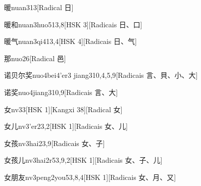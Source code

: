\begin{entry}{暖}{nuan3}{13}[Radical ⽇]
\end{entry}

\begin{entry}{暖和}{nuan3huo5}{13,8}[HSK 3][Radicais ⽇、⼝]
\end{entry}

\begin{entry}{暖气}{nuan3qi4}{13,4}[HSK 4][Radicais ⽇、⽓]
\end{entry}

\begin{entry}{那}{nuo2}{6}[Radical ⾢]
\end{entry}

\begin{entry}{诺贝尔奖}{nuo4bei4'er3 jiang3}{10,4,5,9}[Radicais ⾔、⾙、⼩、⼤]
\end{entry}

\begin{entry}{诺奖}{nuo4jiang3}{10,9}[Radicais ⾔、⼤]
\end{entry}

\begin{entry}{女}{nv3}{3}[HSK 1][Kangxi 38][Radical ⼥]
\end{entry}

\begin{entry}{女儿}{nv3'er2}{3,2}[HSK 1][Radicais ⼥、⼉]
\end{entry}

\begin{entry}{女孩}{nv3hai2}{3,9}[Radicais ⼥、⼦]
\end{entry}

\begin{entry}{女孩儿}{nv3hai2r5}{3,9,2}[HSK 1][Radicais ⼥、⼦、⼉]
\end{entry}

\begin{entry}{女朋友}{nv3peng2you5}{3,8,4}[HSK 1][Radicais ⼥、⽉、⼜]
\end{entry}

